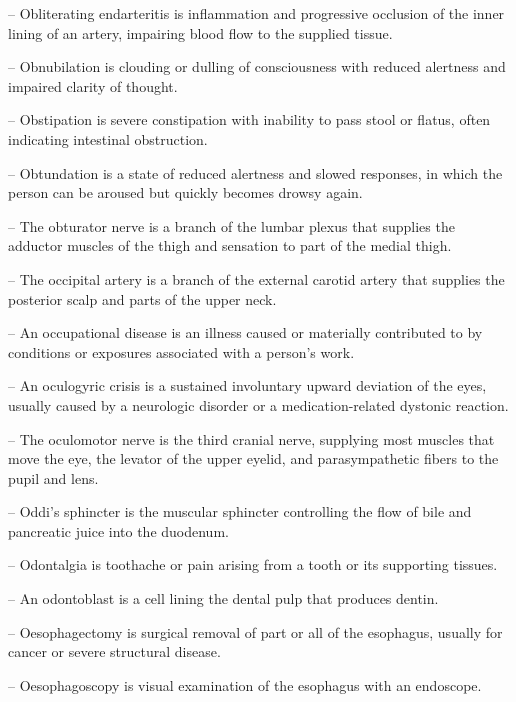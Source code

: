 -- Obliterating endarteritis is inflammation and progressive occlusion of the inner lining of an artery, impairing blood flow to the supplied tissue.

-- Obnubilation is clouding or dulling of consciousness with reduced alertness and impaired clarity of thought.

-- Obstipation is severe constipation with inability to pass stool or flatus, often indicating intestinal obstruction.

-- Obtundation is a state of reduced alertness and slowed responses, in which the person can be aroused but quickly becomes drowsy again.

-- The obturator nerve is a branch of the lumbar plexus that supplies the adductor muscles of the thigh and sensation to part of the medial thigh.

-- The occipital artery is a branch of the external carotid artery that supplies the posterior scalp and parts of the upper neck.

-- An occupational disease is an illness caused or materially contributed to by conditions or exposures associated with a person's work.

-- An oculogyric crisis is a sustained involuntary upward deviation of the eyes, usually caused by a neurologic disorder or a medication-related dystonic reaction.

-- The oculomotor nerve is the third cranial nerve, supplying most muscles that move the eye, the levator of the upper eyelid, and parasympathetic fibers to the pupil and lens.

-- Oddi's sphincter is the muscular sphincter controlling the flow of bile and pancreatic juice into the duodenum.

-- Odontalgia is toothache or pain arising from a tooth or its supporting tissues.

-- An odontoblast is a cell lining the dental pulp that produces dentin.

-- Oesophagectomy is surgical removal of part or all of the esophagus, usually for cancer or severe structural disease.

-- Oesophagoscopy is visual examination of the esophagus with an endoscope.

